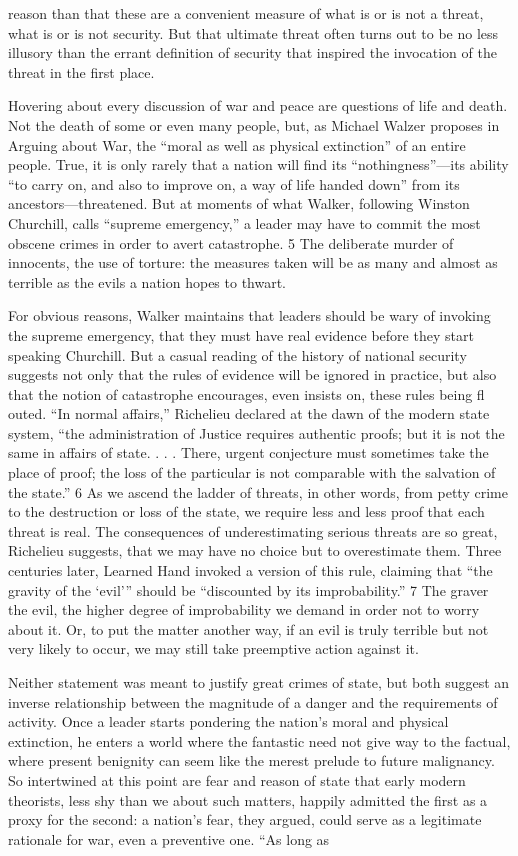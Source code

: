 reason than that these are a convenient measure of what is or is not a threat, what is or is not security. But that ultimate threat often turns out to be no less illusory than the errant definition of security that inspired the invocation of the threat in the first place.{\par} Hovering about every discussion of war and peace are questions of life and death. Not the death of some or even many people, but, as Michael Walzer proposes in Arguing about War, the “moral as well as physical extinction” of an entire people. True, it is only rarely that a nation will find its “nothingness”—its ability “to carry on, and also to improve on, a way of life handed down” from its ancestors—threatened. But at moments of what Walker, following Winston Churchill, calls “supreme emergency,” a leader may have to commit the most obscene crimes in order to avert catastrophe. {\color{blue} 5 } The deliberate murder of innocents, the use of torture: the measures taken will be as many and almost as terrible as the evils a nation hopes to thwart.{\par} For obvious reasons, Walker maintains that leaders should be wary of invoking the supreme emergency, that they must have real evidence before they start speaking Churchill. But a casual reading of the history of national security suggests not only that the rules of evidence will be ignored in practice, but also that the notion of catastrophe encourages, even insists on, these rules being fl outed. “In normal affairs,” Richelieu declared at the dawn of the modern state system, “the administration of Justice requires authentic proofs; but it is not the same in affairs of state. . . . There, urgent conjecture must sometimes take the place of proof; the loss of the particular is not comparable with the salvation of the state.” {\color{blue} 6 } As we ascend the ladder of threats, in other words, from petty crime to the destruction or loss of the state, we require less and less proof that each threat is real. The consequences of underestimating serious threats are so great, Richelieu suggests, that we may have no choice but to overestimate them. Three centuries later, Learned Hand invoked a version of this rule, claiming that “the gravity of the ‘evil’” should be “discounted by its improbability.” {\color{blue} 7 } The graver the evil, the higher degree of improbability we demand in order not to worry about it. Or, to put the matter another way, if an evil is truly terrible but not very likely to occur, we may still take preemptive action against it.{\par} Neither statement was meant to justify great crimes of state, but both suggest an inverse relationship between the magnitude of a danger and the requirements of activity. Once a leader starts pondering the nation’s moral and physical extinction, he enters a world where the fantastic need not give way to the factual, where present benignity can seem like the merest prelude to future malignancy. So intertwined at this point are fear and reason of state that early modern theorists, less shy than we about such matters, happily admitted the first as a proxy for the second: a nation’s fear, they argued, could serve as a legitimate rationale for war, even a preventive one. “As long as 